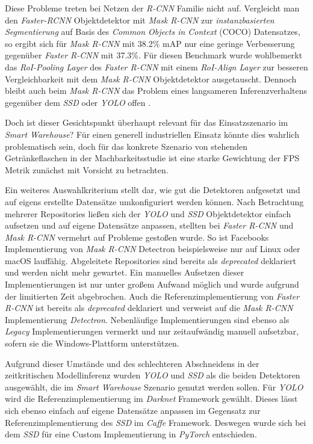 Diese Probleme treten bei Netzen der \textit{R-CNN} Familie nicht auf. Vergleicht man den \textit{Faster-RCNN} Objektdetektor mit \textit{Mask R-CNN} zur \textit{instanzbasierten Segmentierung} auf Basis des \textit{Common Objects in Context} (COCO) Datensatzes, so ergibt sich für \textit{Mask R-CNN} mit 38.2\% mAP nur eine geringe Verbesserung gegenüber \textit{Faster R-CNN} mit 37.3\%. Für diesen Benchmark wurde wohlbemerkt das \textit{RoI-Pooling Layer} des \textit{Faster R-CNN} mit einem \textit{RoI-Align Layer} zur besseren Vergleichbarkeit mit dem \textit{Mask R-CNN} Objektdetektor ausgetauscht. Dennoch bleibt auch beim \textit{Mask R-CNN} das Problem eines langsameren Inferenzverhaltens gegenüber dem \textit{SSD} oder \textit{YOLO} offen \cite{IntanPurnamasar.20181215}. 

Doch ist dieser Gesichtspunkt überhaupt relevant für das Einsatzszenario im \textit{Smart Warehouse}? Für einen generell industriellen Einsatz könnte dies wahrlich problematisch sein, doch für das konkrete Szenario von stehenden Getränkeflaschen in der Machbarkeitsstudie ist eine starke Gewichtung der FPS Metrik zunächst mit Vorsicht zu betrachten.

Ein weiteres Auswahlkriterium stellt dar, wie gut die Detektoren aufgesetzt und auf eigens erstellte Datensätze umkonfiguriert werden können. Nach Betrachtung mehrerer Repositories ließen sich der \textit{YOLO} und \textit{SSD} Objektdetektor einfach aufsetzen und auf eigene Datensätze anpassen, stellten bei \textit{Faster R-CNN} und \textit{Mask R-CNN} vermehrt auf Probleme gestoßen wurde. So ist Facebooks Implementierung von \textit{Mask R-CNN} \glqq Detectron\grqq{} beispielsweise nur auf Linux oder macOS lauffähig. Abgeleitete Repositories sind bereits als \textit{deprecated} deklariert und werden nicht mehr gewartet. Ein manuelles Aufsetzen dieser Implementierungen ist nur unter großem Aufwand möglich und wurde aufgrund der limitierten Zeit abgebrochen. Auch die Referenzimplementierung von \textit{Faster R-CNN} ist bereits als \textit{deprecated} deklariert und verweist auf die \textit{Mask R-CNN} Implementierung \textit{Detectron}. Nebenläufige Implementierungen sind ebenso als \textit{Legacy} Implementierungen vermerkt und nur zeitaufwändig manuell aufsetzbar, sofern sie die Windows-Plattform unterstützen.

Aufgrund dieser Umstände und des schlechteren Abschneidens in der zeitkritischen Modellinferenz wurden \textit{YOLO} und \textit{SSD} als die beiden Detektoren ausgewählt, die im \textit{Smart Warehouse} Szenario genutzt werden sollen. Für \textit{YOLO} wird die Referenzimplementierung im \textit{Darknet} Framework gewählt. Dieses lässt sich ebenso einfach auf eigene Datensätze anpassen im Gegensatz zur Referenzimplementierung des \textit{SSD} im \textit{Caffe} Framework. Deswegen wurde sich bei dem \textit{SSD} für eine Custom Implementierung in \textit{PyTorch} entschieden.






